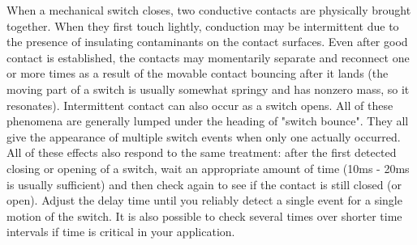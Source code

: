 When a mechanical switch closes, two conductive
contacts are physically brought together.  When
they first touch lightly, conduction may be
intermittent due to the presence of insulating
contaminants on the contact surfaces.  Even after
good contact is established, the contacts may
momentarily  separate and reconnect one or more
times as a result of the movable contact bouncing
after it lands (the moving part of a switch is
usually somewhat springy and has nonzero mass, so
it resonates).  Intermittent contact can also occur
as a switch opens.  All of these phenomena are
generally lumped under the heading of "switch
bounce". They all give the appearance of multiple
switch events when only one actually occurred.
All of these effects also respond to the same
treatment:  after the first detected closing or
opening of a switch, wait an appropriate amount
of time (10ms - 20ms is usually sufficient) and
then check again to see if the contact is still
closed (or open).  Adjust the delay time until
you reliably detect a single event for a single
motion of the switch.  It is also possible to check
several times over shorter time intervals if time
is critical in your application.
